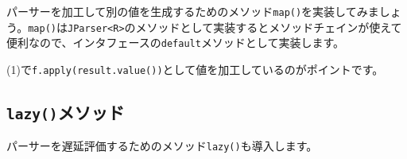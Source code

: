パーサーを加工して別の値を生成するためのメソッド\texttt{map()}を実装してみましょう。\texttt{map()}は\texttt{JParser\textless{}R\textgreater{}}のメソッドとして実装するとメソッドチェインが使えて便利なので、インタフェースの\texttt{default}メソッドとして実装します。

\begin{Shaded}
\begin{Highlighting}[]
    \NormalTok{(}

            \NormalTok{) } \NormalTok{;}
              \NormalTok{()); }
\NormalTok{        \};}
\NormalTok{    \}}
\NormalTok{\}}
\end{Highlighting}
\end{Shaded}

(1)で\texttt{f.apply(result.value())}として値を加工しているのがポイントです。

\hypertarget{chapter6-lazyux30e1ux30bdux30c3ux30c9}{%
\subsection{\texorpdfstring{\texttt{lazy()}メソッド}{lazy()メソッド}}\label{chapter6-lazyux30e1ux30bdux30c3ux30c9}}

パーサーを遅延評価するためのメソッド\texttt{lazy()}も導入します。

\begin{Shaded}
\begin{Highlighting}[]
 
     
\NormalTok{    \}}
\NormalTok{\}}
\end{Highlighting}
\end{Shaded}

